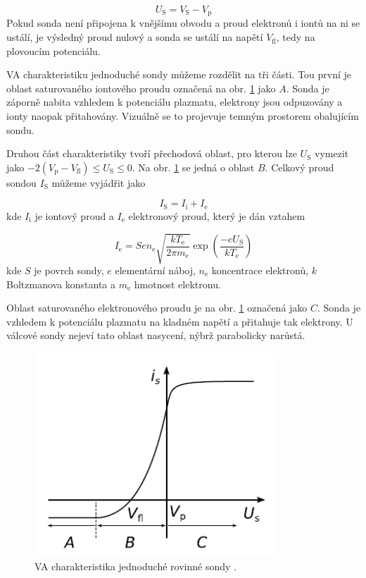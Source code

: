 \documentclass[a4paper,12pt]{article}
\begin{document}
\begin{equation}
	U_\text{S} = V_\text{S} - V_\text{p}
	\label{Usondy}
\end{equation}
Pokud sonda není připojena k vnějšímu obvodu a proud elektronů i iontů na ni se ustálí, je výsledný proud nulový a sonda se ustálí na napětí $V_\text{{fl}}$, tedy na plovoucím potenciálu.

VA charakteristiku jednoduché sondy můžeme rozdělit na tři části. Tou první je oblast saturovaného iontového proudu označená na obr.
\ref{VA} jako $A$. Sonda je záporně nabita vzhledem k potenciálu plazmatu, elektrony jsou odpuzovány a ionty naopak přitahovány. Vizuálně se to projevuje temným prostorem obalujícím sondu.

Druhou část charakteristiky tvoří přechodová oblast, pro kterou lze 
$U_\text{S}$ vymezit jako $-2 (V_\text{p} - V_\text{{fl}}) \leq
U_\text{S} \leq 0$. Na obr. \ref{VA} se jedná o oblast $B$. Celkový proud 
sondou $I_\text{S}$ můžeme vyjádřit jako

\begin{equation}
	I_\text{S} = I_\text{i} + I_\text{e}
\end{equation}
kde $I_\text{i}$ je iontový proud a $I_\text{e}$ elektronový proud, který je dán vztahem

\begin{equation}
	I_\text{e} = S e n_\text{e} \sqrt{\frac{k T_\text{e}}{2 \pi m_\text{e}}} \exp \left(\frac{-eU_\text{S}}{k T_\text{e}}\right)
	\label{eproud}
\end{equation}
kde $S$ je povrch sondy, $e$ elementární náboj, $n_\text{e}$ koncentrace elektronů, $k$ Boltzmanova konstanta a $m_\text{e}$ hmotnost
elektronu.

Oblast saturovaného elektronového proudu je na obr. \ref{VA} označená jako $C$. Sonda je vzhledem k potenciálu plazmatu na kladném
napětí a přitahuje tak elektrony. U válcové sondy nejeví tato oblast nasycení, nýbrž parabolicky narůstá.


\begin{figure}[h]
	\centering
	\includegraphics[width=90mm]{VA.png}
	\caption{VA charakteristika jednoduché rovinné sondy \cite{VA}.}
	\label{VA}
\end{figure}	
\end{document}
